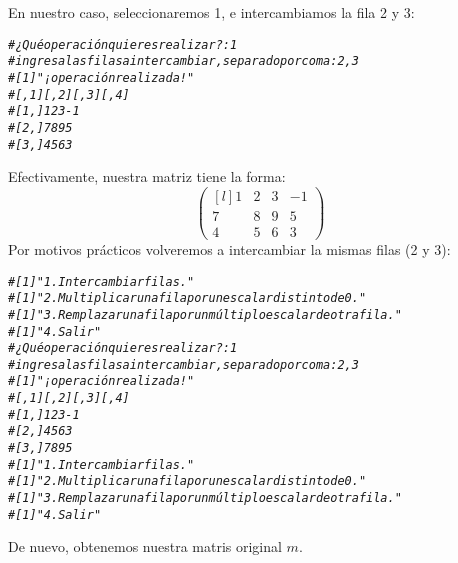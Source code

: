 \documentclass{article}\usepackage[]{graphicx}\usepackage[]{color}
\makeatletter
\newcommand{\hlcom}[1]{\textcolor[rgb]{0.678,0.584,0.686}{\textit{#1}}}%
\newenvironment{kframe}{%
 \def\at@end@of@kframe{}%
 \ifinner\ifhmode%
  \def\at@end@of@kframe{\end{minipage}}%
  \begin{minipage}{\columnwidth}%
 \fi\fi%
 \def\FrameCommand##1{\hskip\@totalleftmargin \hskip-\fboxsep
 \colorbox{shadecolor}{##1}\hskip-\fboxsep
     \hskip-\linewidth \hskip-\@totalleftmargin \hskip\columnwidth}%
 \MakeFramed {\advance\hsize-\width
   \@totalleftmargin\z@ \linewidth\hsize
   \@setminipage}}%
 {\par\unskip\endMakeFramed%
 \at@end@of@kframe}
\newenvironment{knitrout}{}{} %
\makeatother
\begin{document}
En nuestro caso, seleccionaremos 1, e intercambiamos la fila 2 y 3:
\begin{knitrout}
\color{fgcolor}\begin{kframe}
\begin{alltt}
\hlcom{# ¿Qué operación quieres realizar?:1}
\hlcom{# ingresa las filas a intercambiar, separado por coma:2,3}
\hlcom{# [1] "¡operación realizada!"}
\hlcom{#      [,1] [,2] [,3] [,4]}
\hlcom{# [1,]    1    2    3   -1}
\hlcom{# [2,]    7    8    9    5}
\hlcom{# [3,]    4    5    6    3}
\end{alltt}
\end{kframe}
\end{knitrout}
Efectivamente, nuestra matriz tiene la forma:
\begin{equation*}
\begin{pmatrix*}[l]
1 & 2 & 3 & -1\\
7 & 8 & 9 & 5\\
4 & 5 & 6 & 3
\end{pmatrix*}
\end{equation*}
Por motivos prácticos volveremos a intercambiar la mismas filas (2 y 3): 
\begin{knitrout}
\color{fgcolor}\begin{kframe}
\begin{alltt}
\hlcom{# [1] "1. Intercambiar filas."}
\hlcom{# [1] "2. Multiplicar una fila por un escalar distinto de 0."}
\hlcom{# [1] "3. Remplazar una fila por un múltiplo escalar de otra fila."}
\hlcom{# [1] "4. Salir"}
\hlcom{# ¿Qué operación quieres realizar?:1}
\hlcom{# ingresa las filas a intercambiar, separado por coma:2,3}
\hlcom{# [1] "¡operación realizada!"}
\hlcom{#      [,1] [,2] [,3] [,4]}
\hlcom{# [1,]    1    2    3   -1}
\hlcom{# [2,]    4    5    6    3}
\hlcom{# [3,]    7    8    9    5}
\hlcom{# [1] "1. Intercambiar filas."}
\hlcom{# [1] "2. Multiplicar una fila por un escalar distinto de 0."}
\hlcom{# [1] "3. Remplazar una fila por un múltiplo escalar de otra fila."}
\hlcom{# [1] "4. Salir"}
\end{alltt}
\end{kframe}
\end{knitrout}
De nuevo, obtenemos nuestra matris original $m$. 
\end{document}
